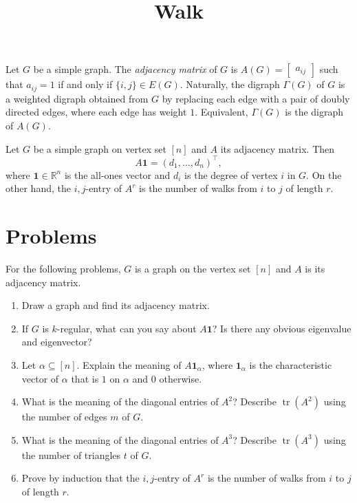 \documentclass{article}
\title{Walk}
\date{\vspace{-1cm}}
\newcommand{\trans}{^\top}
\newcommand{\bone}{\mathbf{1}}
\newcommand{\tr}{\operatorname{tr}}
\theoremstyle{definition}
\begin{document}
\maketitle
\large

Let $G$ be a simple graph.  The \emph{adjacency matrix} of $G$ is $A(G) = \begin{bmatrix} a_{ij} \end{bmatrix}$ such that $a_{ij} = 1$ if and only if $\{i,j\}\in E(G)$.  Naturally, the digraph $\Gamma(G)$ of $G$ is a weighted digraph obtained from $G$ by replacing each edge with a pair of doubly directed edges, where each edge has weight $1$.  Equivalent, $\Gamma(G)$ is the digraph of $A(G)$.

Let $G$ be a simple graph on vertex set $[n]$ and $A$ its adjacency matrix.  Then 
\[A\bone = (d_1,\ldots,d_n)\trans,\]
where $\bone\in\mathbb{R}^n$ is the all-ones vector and $d_i$ is the degree of vertex $i$ in $G$.  On the other hand, the $i,j$-entry of $A^r$ is the number of walks from $i$ to $j$ of length $r$.  
  
\section*{Problems}
For the following problems, $G$ is a graph on the vertex set $[n]$ and $A$ is its adjacency matrix.
\begin{enumerate}
\setlength\itemsep{2em}
\item Draw a graph and find its adjacency matrix.
\item If $G$ is $k$-regular, what can you say about $A\bone$?  Is there any obvious eigenvalue and eigenvector?
\item Let $\alpha\subseteq[n]$.  Explain the meaning of $A\bone_\alpha$, where $\bone_\alpha$ is the characteristic vector of $\alpha$ that is $1$ on $\alpha$ and $0$ otherwise.  
\item What is the meaning of the diagonal entries of $A^2$?  Describe $\tr(A^2)$ using the number of edges $m$ of $G$.
\item What is the meaning of the diagonal entries of $A^3$?  Describe $\tr(A^3)$ using the number of triangles $t$ of $G$.
\item Prove by induction that the $i,j$-entry of $A^r$ is the number of walks from $i$ to $j$ of length $r$.
\end{enumerate}

\end{document}
